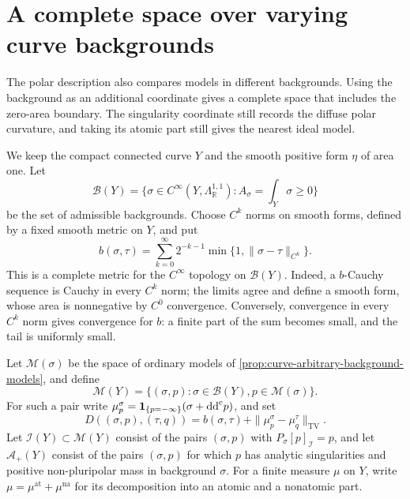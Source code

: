 \section{A complete space over varying curve backgrounds}
\label{sec:joint-curve-model-spaces}

The polar description also compares models in different backgrounds. Using the background as an additional coordinate gives a complete space that includes the zero-area boundary. The singularity coordinate still records the diffuse polar curvature, and taking its atomic part still gives the nearest ideal model.

We keep the compact connected curve $Y$ and the smooth positive form $\eta$ of area one. Let
\[
 \mathcal B(Y)=\{\sigma\in C^\infty(Y,\Lambda^{1,1}_{\mathbb R}):
                         A_\sigma=\textstyle\int_Y\sigma\geq0\}
\]
be the set of admissible backgrounds. Choose $C^k$ norms on smooth forms, defined by a fixed smooth metric on $Y$, and put
\begin{equation}\label{eq:curve-background-smooth-metric}
 b(\sigma,\tau)=\sum_{k=0}^\infty2^{-k-1}
              \min\{1,\|\sigma-\tau\|_{C^k}\}.
\end{equation}
This is a complete metric for the $C^\infty$ topology on $\mathcal B(Y)$. Indeed, a $b$-Cauchy sequence is Cauchy in every $C^k$ norm; the limits agree and define a smooth form, whose area is nonnegative by $C^0$ convergence. Conversely, convergence in every $C^k$ norm gives convergence for $b$: a finite part of the sum becomes small, and the tail is uniformly small.

Let $\mathcal M(\sigma)$ be the space of ordinary models of \cref{prop:curve-arbitrary-background-models}, and define
\[
 \mathscr M(Y)=\{(\sigma,p):\sigma\in\mathcal B(Y),
                                  p\in\mathcal M(\sigma)\}.
\]
For such a pair write $\mu_p^\sigma=\mathbf1_{\{p=-\infty\}}(\sigma+\mathrm{dd}^{\mathrm{c}} p)$, and set
\begin{equation}\label{eq:joint-curve-model-metric}
 D((\sigma,p),(\tau,q))
       =b(\sigma,\tau)+\|\mu_p^\sigma-\mu_q^\tau\|_{\mathrm{TV}}.
\end{equation}
Let $\mathscr I(Y)\subset\mathscr M(Y)$ consist of the pairs $(\sigma,p)$ with $P_\sigma[p]_{\mathcal I}=p$, and let $\mathscr A_+(Y)$ consist of the pairs $(\sigma,p)$ for which $p$ has analytic singularities and positive non-pluripolar mass in background $\sigma$. For a finite measure $\mu$ on $Y$, write $\mu=\mu^{\mathrm{at}}+\mu^{\mathrm{na}}$ for its decomposition into an atomic and a nonatomic part.

